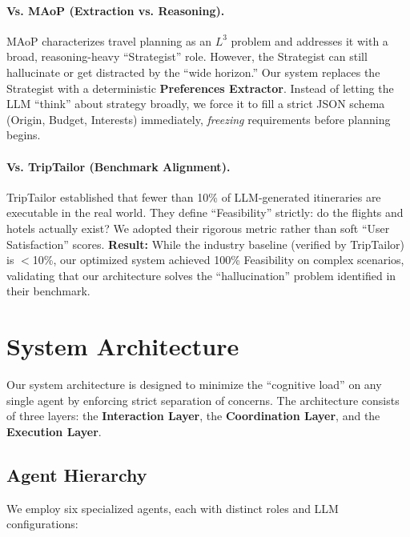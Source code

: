 \documentclass[10pt,twocolumn]{article}
\begin{document}
\paragraph{Vs. MAoP (Extraction vs. Reasoning).}
MAoP \cite{yang2025planyourtravel} characterizes travel planning as an $L^3$ problem and addresses it with a broad, reasoning-heavy ``Strategist'' role. However, the Strategist can still hallucinate or get distracted by the ``wide horizon.'' Our system replaces the Strategist with a deterministic \textbf{Preferences Extractor}. Instead of letting the LLM ``think'' about strategy broadly, we force it to fill a strict JSON schema (Origin, Budget, Interests) immediately, \textit{freezing} requirements before planning begins.

\paragraph{Vs. TripTailor (Benchmark Alignment).}
TripTailor \cite{shen2025triptailor} established that fewer than 10\% of LLM-generated itineraries are executable in the real world. They define ``Feasibility'' strictly: do the flights and hotels actually exist? We adopted their rigorous metric rather than soft ``User Satisfaction'' scores. \textbf{Result:} While the industry baseline (verified by TripTailor) is $<$10\%, our optimized system achieved 100\% Feasibility on complex scenarios, validating that our architecture solves the ``hallucination'' problem identified in their benchmark.

\section{System Architecture}

Our system architecture is designed to minimize the ``cognitive load'' on any single agent by enforcing strict separation of concerns. The architecture consists of three layers: the \textbf{Interaction Layer}, the \textbf{Coordination Layer}, and the \textbf{Execution Layer}.

\subsection{Agent Hierarchy}

We employ six specialized agents, each with distinct roles and LLM configurations:
\end{document}
